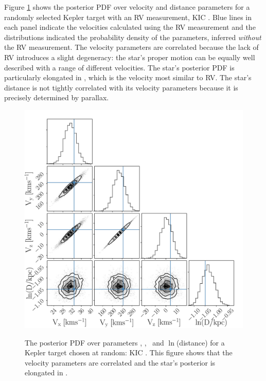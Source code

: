 Figure \ref{fig:posterior} shows the posterior PDF over velocity and distance
parameters for a randomly selected Kepler target with an RV measurement, KIC
\kicstar.
Blue lines in each panel indicate the velocities calculated using the RV
measurement and the distributions indicated the probability density of the
parameters, inferred {\it without} the RV measurement.
The velocity parameters are correlated because the lack of RV introduces a
slight degeneracy: the star's proper motion can be equally well described with
a range of different velocities.
The star's posterior PDF is particularly elongated in \vy, which is the
velocity most similar to RV.
The star's distance is not tightly correlated with its velocity parameters
because it is precisely determined by parallax.
\begin{figure}[ht!]
\caption{
The posterior PDF over parameters \vx, \vy, \vz\ and $\ln$(distance) for a
    Kepler target chosen at random: KIC \kicstar.
This figure shows that the velocity parameters are correlated and the star's
    posterior is elongated in \vy.
    }
  \centering
    \includegraphics[width=.7\textwidth]{posterior}
\label{fig:posterior}
\end{figure}
